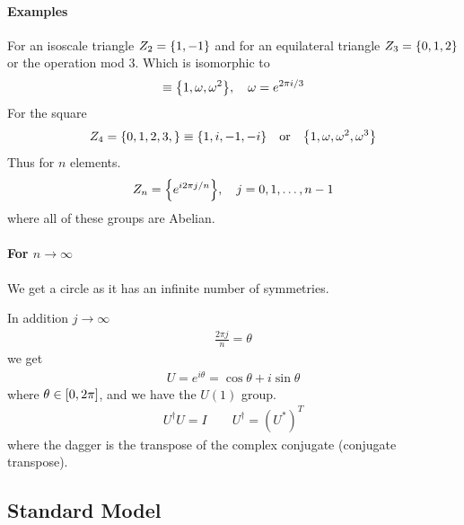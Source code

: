 \documentclass[../main.tex]{subfiles}
\begin{document}
\paragraph{Examples} For an isoscale triangle $Z_2 = \qt{1, -1}$ and for an equilateral triangle
$Z_3 = \qt{0, 1, 2}$ or the operation mod 3. Which is isomorphic to
\begin{align*}
    \equiv \qt{1, \omega, \omega^2}, \quad  \omega = e^{2\pi i/3}
\end{align*}
For the square
\begin{align*}
    Z_4 = \qt{0, 1, 2, 3,} \equiv \qt{1, i, -1, -i} \qor \qt{1, \omega, \omega^2, \omega^3}
\end{align*}
Thus for $n$ elements.
\begin{align*}
    Z_n = \qt{e^{i2\pi j/n}}, \quad j = 0, 1, \dots, n-1
\end{align*}
where all of these groups are Abelian.

\paragraph{For $n \rightarrow \infty$} We get a circle as it has an infinite number of symmetries.

In addition $j \rightarrow \infty$
\begin{align*}
    \frac{2\pi j}{n} = \theta 
\end{align*}
we get
\begin{align*}
    U = e^{i\theta} = \cos \theta + i \sin \theta
\end{align*}
where $\theta \in \qt[0, 2\pi]$, and we have the $U(1)$ group.
\begin{align*}
    U^\dagger U = I \qquad U^\dagger = (U^*)^T
\end{align*}
where the dagger is the transpose of the complex conjugate (conjugate transpose).

\subsection*{Standard Model}
\end{document}
